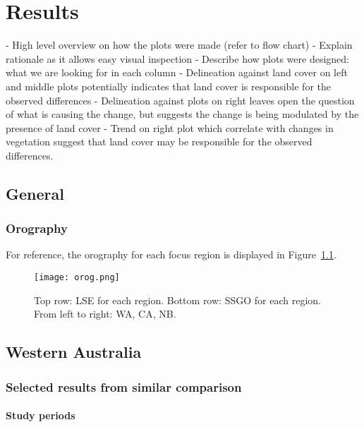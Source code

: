 \chapter{Results}
\label{ch:results}

- High level overview on how the plots were made (refer to flow chart)
- Explain rationale as it allows easy visual inspection
- Describe how plots were designed: what we are looking for in each column
- Delineation against land cover on left and middle plots potentially indicates that land cover is responsible for the observed differences
- Delineation against plots on right leaves open the question of what is causing the change, but suggests the change is being modulated by the presence of land cover
- Trend on right plot which correlate with changes in vegetation suggest that land cover may be responsible for the observed differences.

\section{General}

\subsection{Orography}

For reference, the orography for each focus region is displayed in Figure~\ref{fig:orog}.

\begin{figure}[!ht]
	\centering
	\texttt{[image: orog.png]}
	\caption[Orography for each focus region]{Top row: \acf{LSE} for each region. Bottom row: \acf{SSGO} for each region. From left to right: \acl{WA}, \acl{CA}, \acl{NB}.}
	\label{fig:orog}
\end{figure}

\section{Western Australia}
\label{sec:results_wa}

\subsection{Selected results from similar comparison}

\subsubsection{Study periods}

